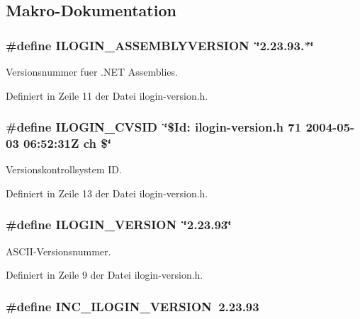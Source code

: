 \subsection{Makro-Dokumentation}
\hypertarget{ilogin-version_8h_a3}{
\subsubsection[ILOGIN\_\-ASSEMBLYVERSION]{\setlength{\rightskip}{0pt plus 5cm}\#define ILOGIN\_\-ASSEMBLYVERSION\ \char`\"{}2.23.93.$\ast$\char`\"{}}}
\label{ilogin-version_8h_a3}


Versionsnummer fuer .NET Assemblies. 



Definiert in Zeile 11 der Datei ilogin-version.h.\hypertarget{ilogin-version_8h_a4}{
\subsubsection[ILOGIN\_\-CVSID]{\setlength{\rightskip}{0pt plus 5cm}\#define ILOGIN\_\-CVSID\ \char`\"{}\$Id: ilogin-version.h 71 2004-05-03 06:52:31Z ch \$\char`\"{}}}
\label{ilogin-version_8h_a4}


Versionskontrollsystem ID. 



Definiert in Zeile 13 der Datei ilogin-version.h.\hypertarget{ilogin-version_8h_a2}{
\subsubsection[ILOGIN\_\-VERSION]{\setlength{\rightskip}{0pt plus 5cm}\#define ILOGIN\_\-VERSION\ \char`\"{}2.23.93\char`\"{}}}
\label{ilogin-version_8h_a2}


ASCII-Versionsnummer. 



Definiert in Zeile 9 der Datei ilogin-version.h.\hypertarget{ilogin-version_8h_a0}{
\subsubsection[INC\_\-ILOGIN\_\-VERSION]{\setlength{\rightskip}{0pt plus 5cm}\#define INC\_\-ILOGIN\_\-VERSION\ 2.23.93}}
\label{ilogin-version_8h_a0}


